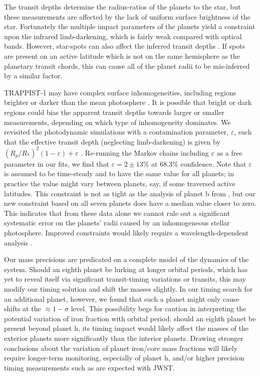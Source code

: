 \documentclass[fleqn,usenatbib]{mnras} %
\begin{document}
The transit depths
determine the radius-ratios of the planets to the star, but these
measurements are affected by the lack of uniform surface brightness
of the star.  Fortunately the multiple impact parameters of the
planets yield a constraint upon the infrared limb-darkening, which
is fairly weak compared with optical bands.  However, star-spots
can also affect the inferred transit depths \citep{Rackham2018,
Kipping2012b}.  If spots are present on an active latitude
which is not on the same hemisphere as the planetary transit chords,
this can cause all of the planet radii to be mis-inferred by a similar
factor.

TRAPPIST-1 may have complex surface inhomogeneities, including regions brighter or darker than the mean photosphere  \citep{Morris2018d,Wakeford2019}. It is possible that bright or dark regions could bias the apparent transit depths towards larger or smaller measurements, depending on which type of inhomogeneity dominates. We revisited the photodynamic simulations with a contamination parameter,
$\varepsilon$, such that the effective transit depth (neglecting limb-darkening) is given by $(R_p/R_*)^2(1-\varepsilon) +
\varepsilon$ \citep{Morris2018b,Morris2018c}.  Re-running the Markov chains 
including $\varepsilon$ as a free parameter in our fits, we
find that $\varepsilon = 2\pm 13$\% at 68.3\% confidence.  Note that $\varepsilon$ is assumed to be time-steady and to have the same value for all planets; in practice the value might vary between planets, say, if some traversed active latitudes.  
This constraint is not as tight as the analysis of planet b from \citet{Morris2018c}, but our new constraint based on all seven planets does have a median value closer to zero.
This indicates that from these data alone we cannot rule out a significant systematic error on the planets' radii caused by an inhomogeneous stellar photosphere.
Improved constraints would likely require a wavelength-dependent analysis \citep[e.g.][]{Rackham2018,Wakeford2019}.

Our mass precisions are predicated on a complete model of the dynamics of the system.  Should an eighth planet be lurking at longer orbital periods, which has yet to reveal itself via significant transit-timing variations or transits, this may modify our timing solution and shift the masses slightly.  In our timing search for an additional planet, however, we found that such a planet might only cause shifts at the $\approx 1-\sigma$ level.  This possibility begs for caution in interpreting the potential variation of iron fraction with orbital period:  should an eighth planet be present beyond planet h, its timing impact would likely affect the masses of the exterior planets more significantly than the interior planets.  Drawing stronger conclusions about the variation of planet iron/core mass fractions will likely require longer-term monitoring, especially of planet h, and/or higher precision timing measurements such as are expected with JWST.
\end{document}
